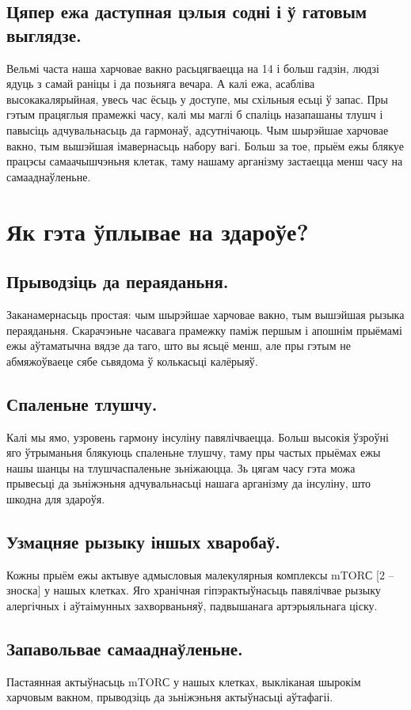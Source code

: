 \subsection{Цяпер ежа даступная цэлыя содні і ў гатовым выглядзе.}
Вельмі часта наша харчовае вакно расьцягваецца на 14 і больш гадзін, людзі ядуць з самай раніцы і да позьняга вечара. А калі ежа, асабліва высокакалярыйная, увесь час ёсьць у доступе, мы схільныя есьці ў запас. Пры гэтым працяглыя прамежкі часу, калі мы маглі б спаліць назапашаны тлушч і павысіць адчувальнасьць да гармонаў, адсутнічаюць. Чым шырэйшае харчовае вакно, тым вышэйшая імавернасьць набору вагі. Больш за тое, прыём ежы блякуе працэсы самаачышчэньня клетак, таму нашаму арганізму застаецца менш часу на самааднаўленьне.

\section{Як гэта ўплывае на здароўе?}

\subsection{Прыводзіць да пераяданьня.}
Заканамернасьць простая: чым шырэйшае харчовае вакно, тым вышэйшая рызыка пераяданьня. Скарачэньне часавага прамежку паміж першым і апошнім прыёмамі ежы аўтаматычна вядзе да таго, што вы ясьцё менш, але пры гэтым не абмяжоўваеце сябе сьвядома ў колькасьці калёрыяў.

\subsection{Спаленьне тлушчу.}
Калі мы ямо, узровень гармону інсуліну павялічваецца. Больш высокія ўзроўні яго ўтрыманьня блякуюць спаленьне тлушчу, таму пры частых прыёмах ежы нашы шанцы на тлушчаспаленьне зьніжаюцца. Зь цягам часу гэта можа прывесьці да зьніжэньня адчувальнасьці нашага арганізму да інсуліну, што шкодна для здароўя.

\subsection{Узмацняе рызыку іншых хваробаў.}
Кожны прыём ежы актывуе адмысловыя малекулярныя комплексы mTORС [2 -- зноска] у нашых клетках. Яго хранічная гіпэрактыўнасьць павялічвае рызыку алергічных і аўтаімунных захворваньняў, падвышанага артэрыяльнага ціску.

\subsection{Запавольвае самааднаўленьне.}
Пастаянная актыўнасьць mTORС у нашых клетках, выкліканая шырокім харчовым вакном, прыводзіць да зьніжэньня актыўнасьці аўтафагіі.

